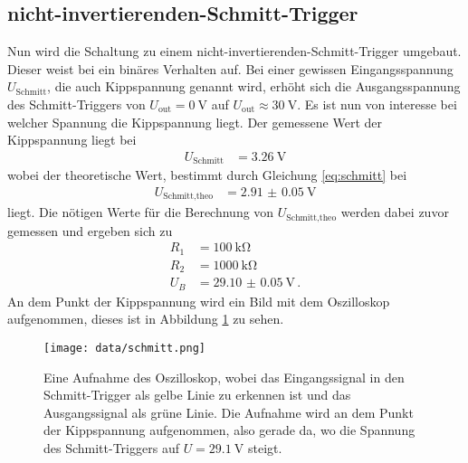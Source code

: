 \subsection{nicht-invertierenden-Schmitt-Trigger}
Nun wird die Schaltung zu einem nicht-invertierenden-Schmitt-Trigger umgebaut.
Dieser weist bei ein binäres Verhalten auf.
Bei einer gewissen Eingangsspannung $U_\text{Schmitt}$, die auch Kippspannung genannt wird, erhöht sich die Ausgangsspannung des Schmitt-Triggers von $U_\text{out}= \SI{0}{\V}$ auf $U_\text{out}\approx \SI{30}{\V}$.
Es ist nun von interesse bei welcher Spannung die Kippspannung liegt.
Der gemessene Wert der Kippspannung liegt bei 
\begin{align*}
    U_\text{Schmitt} &= \SI{3.26}{\V}
\end{align*}
wobei der theoretische Wert, bestimmt durch Gleichung \eqref{eq:schmitt} bei 
\begin{align*}
    U_\text{Schmitt,theo} &= \SI{2.91(5)}{\V}
\end{align*}
liegt.
Die nötigen Werte für die Berechnung von $ U_\text{Schmitt,theo}$ werden dabei zuvor gemessen und ergeben sich zu
\begin{align*}
    R_1 &= \SI{100}{\kilo\ohm}\\
    R_2 &= \SI{1000}{\kilo\ohm}\\
    U_B &= \SI{29.10(5)}{\V} \, .
\end{align*}
An dem Punkt der Kippspannung wird ein Bild mit dem Oszilloskop aufgenommen, dieses ist in Abbildung \ref{fig:schmitt_oszi} zu sehen.
\begin{figure}
    \centering
    \texttt{[image: data/schmitt.png]}
    \caption{Eine Aufnahme des Oszilloskop, wobei das Eingangssignal in den Schmitt-Trigger als gelbe Linie zu erkennen ist und das Ausgangssignal als grüne Linie.
    Die Aufnahme wird an dem Punkt der Kippspannung aufgenommen, also gerade da, wo die Spannung des Schmitt-Triggers auf $U=\SI{29.1}{\V}$ steigt.}
    \label{fig:schmitt_oszi}
\end{figure}
\FloatBarrier
